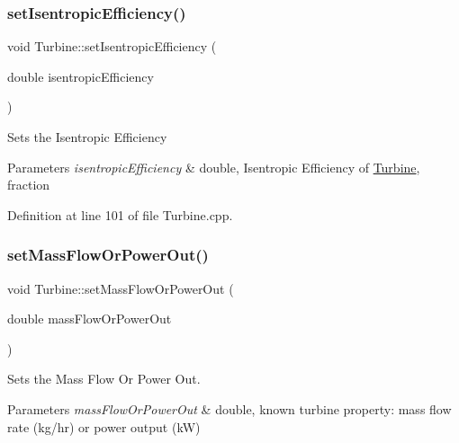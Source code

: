 \subsubsection{\texorpdfstring{set\+Isentropic\+Efficiency()}{setIsentropicEfficiency()}\hspace{0.1cm}{\footnotesize\ttfamily [3/3]}}
{\footnotesize\ttfamily void Turbine\+::set\+Isentropic\+Efficiency (\begin{DoxyParamCaption}\item[{double}]{isentropic\+Efficiency }\end{DoxyParamCaption})}

Sets the Isentropic Efficiency


\begin{DoxyParams}{Parameters}
{\em isentropic\+Efficiency} & double, Isentropic Efficiency of \hyperlink{class_turbine}{Turbine}, fraction \\
\hline
\end{DoxyParams}


Definition at line 101 of file Turbine.\+cpp.

\mbox{\label{class_turbine_a73522631e2eeefa8ea14d5b537e3e760}} 
\subsubsection{\texorpdfstring{set\+Mass\+Flow\+Or\+Power\+Out()}{setMassFlowOrPowerOut()}\hspace{0.1cm}{\footnotesize\ttfamily [1/3]}}
{\footnotesize\ttfamily void Turbine\+::set\+Mass\+Flow\+Or\+Power\+Out (\begin{DoxyParamCaption}\item[{double}]{mass\+Flow\+Or\+Power\+Out }\end{DoxyParamCaption})}



Sets the Mass Flow Or Power Out. 


\begin{DoxyParams}{Parameters}
{\em mass\+Flow\+Or\+Power\+Out} & double, known turbine property\+: mass flow rate (kg/hr) or power output (kW) \\
\hline
\end{DoxyParams}
\mbox{\label{class_turbine_a73522631e2eeefa8ea14d5b537e3e760}} 
